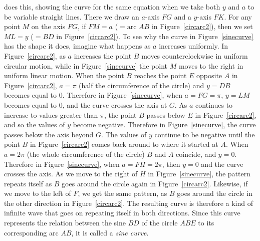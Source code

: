 \documentclass[twoside,openright]{article}
\begin{document}
 does this, showing the curve for the same equation when we take both $y$ and $a$ to be variable straight lines.  There we draw an $a$-axis $FG$ and a $y$-axis $FK$.  For any point $M$ on the axis $FG$, if $FM= a$ ($=\mbox{arc }AB$ in Figure~\ref{circarc2}), then we set $ML=y$ ($=BD$ in Figure~\ref{circarc2}). To see why the curve in Figure~\ref{sinecurve} has the shape it does, imagine what happens as $a$ increases uniformly.  In Figure~\ref{circarc2}, as $a$ increases the point $B$ moves counterclockwise in uniform circular motion, while in Figure~\ref{sinecurve} the point $M$ moves to the right in uniform linear motion.   When the point $B$ reaches the point $E$ opposite $A$ in Figure~\ref{circarc2}, $a= \pi$ (half the circumference of the circle) and $y = DB$ becomes equal to 0.  Therefore in Figure~\ref{sinecurve}, when $a = FG = \pi$, $y=LM$ becomes equal to 0, and the curve crosses the axis at $G$.  As $a$ continues to increase to values greater than $\pi$, the point $B$ passes below $E$ in Figure~\ref{circarc2}, and so the values of $y$ become negative.  Therefore in Figure~\ref{sinecurve}, the curve passes below the axis beyond $G$.  The values of $y$ continue to be negative until the point $B$ in Figure~\ref{circarc2} comes back around to where it started at $A$.  When $a= 2\pi$ (the whole circumference of the circle) $B$ and $A$ coincide, and $y=0$. Therefore in Figure~\ref{sinecurve}, when $a = FH = 2\pi$,  then $y=0$ and the curve crosses the axis.   As we move to the right of $H$ in Figure~\ref{sinecurve}, the pattern repeats itself as $B$ goes around the circle again in Figure~\ref{circarc2}.  Likewise, if we move to the left of $F$, we get the same pattern, as $B$ goes around the circle in the other direction in Figure~\ref{circarc2}.  The resulting curve is therefore a kind of infinite wave that goes on repeating itself in both directions.  Since this curve represents the relation between the sine $BD$ of the circle $ABE$ to its corresponding arc $AB$, it is called a {\em sine curve}.\label{endsin}
 
\end{document}
